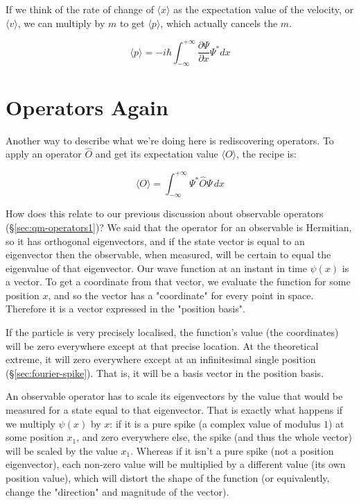 If we think of the rate of change of $\langle x \rangle$ as the expectation value of the velocity, or $\langle v \rangle$, we can multiply by $m$ to get $\langle p \rangle$, which actually cancels the $m$.

$$
\langle p \rangle = -
i \hbar
\int_{-\infty}^{+\infty}
\frac{\partial \Psi}{\partial x}\Psi^*
dx
$$

\section{Operators Again} \label{sec:qm-operators2}

Another way to describe what we're doing here is rediscovering operators. To apply an operator $\hat{O}$ and get its expectation value $\langle O \rangle$, the recipe is:

$$
\langle O \rangle =
\int_{-\infty}^{+\infty}
\Psi^*
\hat{O}
\Psi
\,dx
$$

How does this relate to our previous discussion about observable operators (§\ref{sec:qm-operators1})? We said that the operator for an observable is Hermitian, so it has orthogonal eigenvectors, and if the state vector is equal to an eigenvector then the observable, when measured, will be certain to equal the eigenvalue of that eigenvector. Our wave function at an instant in time $\psi(x)$ is a vector. To get a coordinate from that vector, we evaluate the function for some position $x$, and so the vector has a "coordinate" for every point in space. Therefore it is a vector expressed in the "position basis".

If the particle is very precisely localised, the function's value (the coordinates) will be zero everywhere except at that precise location. At the theoretical extreme, it will zero everywhere except at an infinitesimal single position (§\ref{sec:fourier-spike}). That is, it will be a basis vector in the position basis.

An observable operator has to scale its eigenvectors by the value that would be measured for a state equal to that eigenvector. That is exactly what happens if we multiply $\psi(x)$ by $x$: if it is a pure spike (a complex value of modulus $1$) at some position $x_1$, and zero everywhere else, the spike (and thus the whole vector) will be scaled by the value $x_1$. Whereas if it isn't a pure spike (not a position eigenvector), each non-zero value will be multiplied by a different value (its own position value), which will distort the shape of the function (or equivalently, change the "direction" and magnitude of the vector).

